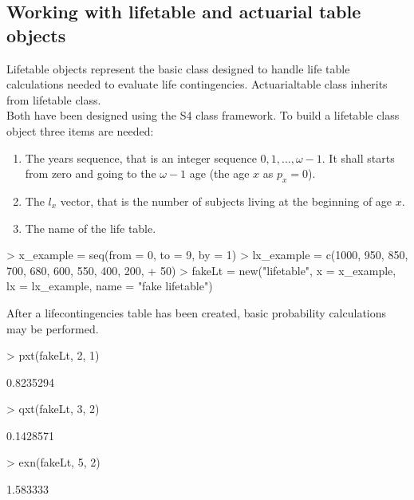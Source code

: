 \documentclass[a4paper]{article}
\begin{document}
\subsection{Working with lifetable and actuarial table objects}

Lifetable objects represent the basic class designed to handle life table calculations needed to evaluate
life contingencies. Actuarialtable class inherits from lifetable class.\\
Both have been designed using the S4 class framework.
To build a lifetable class object three items are needed:
\begin{enumerate}
	\item The years sequence, that is an integer sequence $0,1,\ldots, \omega-1$. It shall starts from zero and going 
	to the $\omega-1$ age (the age $x$ as $p_x=0$).
	\item The $l_x$ vector, that is the number of subjects living at the beginning of age $x$.
	\item The name of the life table.
\end{enumerate}

\begin{Schunk}
\begin{Sinput}
> x_example = seq(from = 0, to = 9, by = 1)
> lx_example = c(1000, 950, 850, 700, 680, 600, 550, 400, 200, 
+     50)
> fakeLt = new("lifetable", x = x_example, lx = lx_example, name = "fake lifetable")
\end{Sinput}
\end{Schunk}

After a lifecontingencies table has been created, basic probability calculations may be performed.

\begin{Schunk}
\begin{Sinput}
> pxt(fakeLt, 2, 1)
\end{Sinput}
\begin{Soutput}
[1] 0.8235294
\end{Soutput}
\begin{Sinput}
> qxt(fakeLt, 3, 2)
\end{Sinput}
\begin{Soutput}
[1] 0.1428571
\end{Soutput}
\begin{Sinput}
> exn(fakeLt, 5, 2)
\end{Sinput}
\begin{Soutput}
[1] 1.583333
\end{Soutput}
\end{Schunk}
\end{document}
